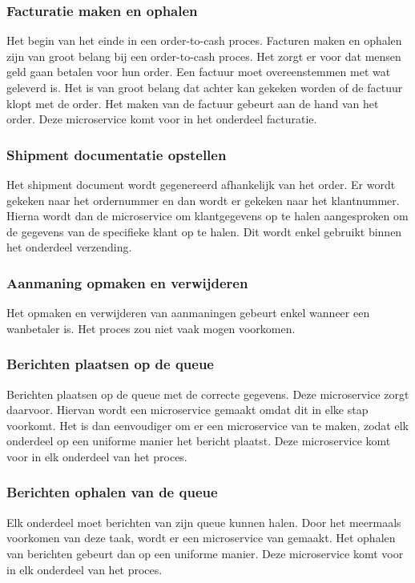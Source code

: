 \subsubsection{Facturatie maken en ophalen}
Het begin van het einde in een order-to-cash proces. Facturen maken en ophalen zijn van groot belang bij een order-to-cash proces. Het zorgt er voor dat mensen geld gaan betalen voor hun order. Een factuur moet overeenstemmen met wat geleverd is. Het is van groot belang dat achter kan gekeken worden of de factuur klopt met de order. Het maken van de factuur gebeurt aan de hand van het order. 
Deze microservice komt voor in het onderdeel facturatie.

\subsubsection{Shipment documentatie opstellen}
Het shipment document wordt gegenereerd afhankelijk van het order. Er wordt gekeken naar het ordernummer en dan wordt er gekeken naar het klantnummer. Hierna wordt dan de microservice om klantgegevens op te halen aangesproken om de gegevens van de specifieke klant op te halen. Dit wordt enkel gebruikt binnen het onderdeel verzending.

\subsubsection{Aanmaning opmaken en verwijderen}
Het opmaken en verwijderen van aanmaningen gebeurt enkel wanneer een wanbetaler is. Het proces zou niet vaak mogen voorkomen. 

\subsubsection{Berichten plaatsen op de queue}
Berichten plaatsen op de queue met de correcte gegevens. Deze microservice zorgt daarvoor. Hiervan wordt een microservice gemaakt omdat dit in elke stap voorkomt. Het is dan eenvoudiger om er een microservice van te maken, zodat elk onderdeel op een uniforme manier het bericht plaatst. 
Deze microservice komt voor in elk onderdeel van het proces.

\subsubsection{Berichten ophalen van de queue} 
Elk onderdeel moet berichten van zijn queue kunnen halen. Door het meermaals voorkomen van deze taak, wordt er een microservice van gemaakt. Het ophalen van berichten gebeurt dan op een uniforme manier. 
Deze microservice komt voor in elk onderdeel van het proces.

